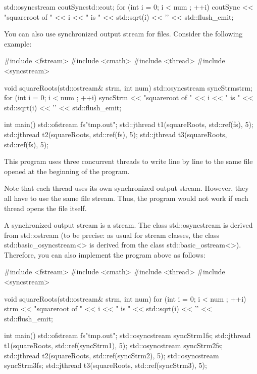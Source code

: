 \begin{cpp}
std::osyncstream coutSync{std::cout};
for (int i = 0; i < num ; ++i) {
	coutSync << "squareroot of " << i << " is "
			 << std::sqrt(i) << '\n' << std::flush_emit;
}
\end{cpp}


You can also use synchronized output stream for files. Consider the following example:


\begin{cpp}
#include <fstream>
#include <cmath>
#include <thread>
#include <syncstream>

void squareRoots(std::ostream& strm, int num)
{
	std::osyncstream syncStrm{strm};
	for (int i = 0; i < num ; ++i) {
		syncStrm << "squareroot of " << i << " is "
				 << std::sqrt(i) << '\n' << std::flush_emit;
	}
}

int main()
{
	std::ofstream fs{"tmp.out"};
	std::jthread t1(squareRoots, std::ref(fs), 5);
	std::jthread t2(squareRoots, std::ref(fs), 5);
	std::jthread t3(squareRoots, std::ref(fs), 5);
}
\end{cpp}

This program uses three concurrent threads to write line by line to the same file opened at the beginning of the program.

Note that each thread uses its own synchronized output stream. However, they all have to use the same file stream. Thus, the program would not work if each thread opens the file itself.


A synchronized output stream is a stream. The class std::osyncstream is derived from std::ostream (to be precise: as usual for stream classes, the class std::basic\_osyncstream<> is derived from the class std::basic\_ostream<>). Therefore, you can also implement the program above as follows:


\begin{cpp}
#include <fstream>
#include <cmath>
#include <thread>
#include <syncstream>

void squareRoots(std::ostream& strm, int num)
{
	for (int i = 0; i < num ; ++i) {
		strm << "squareroot of " << i << " is "
			 << std::sqrt(i) << '\n' << std::flush_emit;
	}
}

int main()
{
	std::ofstream fs{"tmp.out"};
	std::osyncstream syncStrm1{fs};
	std::jthread t1(squareRoots, std::ref(syncStrm1), 5);
	std::osyncstream syncStrm2{fs};
	std::jthread t2(squareRoots, std::ref(syncStrm2), 5);
	std::osyncstream syncStrm3{fs};
	std::jthread t3(squareRoots, std::ref(syncStrm3), 5);
}
\end{cpp}

